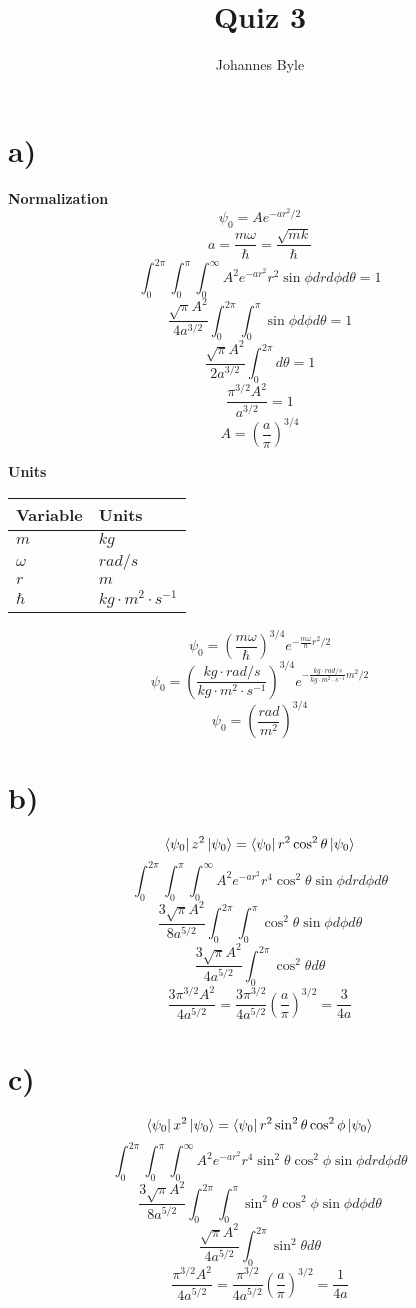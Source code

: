 \documentclass[english]{article}
\begin{document}
\author{Johannes Byle}
\title{Quiz 3}
\maketitle
\section*{a)}

\textbf{Normalization}
$$\psi_0=Ae^{-ar^2/2}$$
$$a=\frac{m\omega}{\hbar}=\frac{\sqrt{mk}}{\hbar}$$
$$\int_0^{2\pi}\int_0^{\pi}\int_0^{\infty}A^2e^{-ar^2}r^2\sin\phi drd\phi d\theta=1$$
$$\frac{\sqrt{\pi}A^2}{4a^{3/2}}\int_0^{2\pi}\int_0^{\pi}\sin\phi d\phi d\theta=1$$
$$\frac{\sqrt{\pi}A^2}{2a^{3/2}}\int_0^{2\pi}d\theta=1$$
$$\frac{\pi^{3/2}A^2}{a^{3/2}}=1$$
$$A=\left(\frac{a}{\pi}\right)^{3/4}$$

\textbf{Units}

\begin{table}[h]
\centering
\begin{tabular}{|l|l|}
\hline
Variable & Units\\ \hline
$m$ & $kg$\\
$\omega$ & $rad/s$\\
$r$ & $m$\\
$\hbar$ & $kg\cdot m^2 \cdot s^{-1}$\\
\hline
\end{tabular}
\end{table}

$$\psi_0=\left(\frac{m\omega}{\hbar}\right)^{3/4}e^{-\frac{m\omega}{\hbar}r^2/2}$$
$$\psi_0=\left(\frac{kg\cdot rad/s}{kg\cdot m^2 \cdot s^{-1}}\right)^{3/4}e^{-\frac{kg\cdot rad/s}{kg\cdot m^2 \cdot s^{-1}}m^2/2}$$
$$\psi_0=\left(\frac{rad}{m^2}\right)^{3/4}$$

\section*{b)}
$$\bra{\psi_0}z^2\ket{\psi_0}=\bra{\psi_0}r^2\cos^2\theta\ket{\psi_0}$$
$$\int_0^{2\pi}\int_0^{\pi}\int_0^{\infty}A^2e^{-ar^2}r^4\cos^2\theta\sin\phi drd\phi d\theta$$
$$\frac{3\sqrt{\pi}A^2}{8a^{5/2}}\int_0^{2\pi}\int_0^{\pi}\cos^2\theta\sin\phi d\phi d\theta$$
$$\frac{3\sqrt{\pi}A^2}{4a^{5/2}}\int_0^{2\pi}\cos^2\theta d\theta$$
$$\frac{3\pi^{3/2}A^2}{4a^{5/2}}=\frac{3\pi^{3/2}}{4a^{5/2}}\left(\frac{a}{\pi}\right)^{3/2}=\frac{3}{4a}$$

\section*{c)}
$$\bra{\psi_0}x^2\ket{\psi_0}=\bra{\psi_0}r^2\sin^2\theta\cos^2\phi\ket{\psi_0}$$
$$\int_0^{2\pi}\int_0^{\pi}\int_0^{\infty}A^2e^{-ar^2}r^4\sin^2\theta\cos^2\phi\sin\phi drd\phi d\theta$$
$$\frac{3\sqrt{\pi}A^2}{8a^{5/2}}\int_0^{2\pi}\int_0^{\pi}\sin^2\theta\cos^2\phi\sin\phi d\phi d\theta$$
$$\frac{\sqrt{\pi}A^2}{4a^{5/2}}\int_0^{2\pi}\sin^2\theta d\theta$$
$$\frac{\pi^{3/2}A^2}{4a^{5/2}}=\frac{\pi^{3/2}}{4a^{5/2}}\left(\frac{a}{\pi}\right)^{3/2}=\frac{1}{4a}$$
\end{document}
